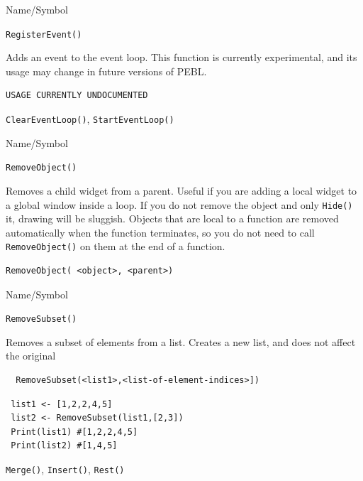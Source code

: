 \begin{desc}{Name/Symbol}
\item[Name/Symbol]  	\verb+RegisterEvent()+ 

\item[Description]  Adds an event to the event loop.  This function is currently experimental, and its usage may change in future versions of PEBL.

\item[Usage]       	
\begin{verbatim}
USAGE CURRENTLY UNDOCUMENTED
\end{verbatim}

\item[Example]	

\item[See Also] 
\verb+ClearEventLoop()+, \verb+StartEventLoop()+
\end{desc}






\begin{desc}{Name/Symbol}
\item[Name/Symbol]	\verb+RemoveObject()+

\item[Description] Removes a child widget from a parent.  Useful if
  you are adding a local widget to a global window inside a loop.  If
  you do not remove the object and only \verb+Hide()+ it, drawing will
  be sluggish.  Objects that are local to a function are removed
  automatically when the function terminates, so you do not need to
  call \verb+RemoveObject()+ on them at the end of a function.

\item[Usage]
\begin{verbatim}
RemoveObject( <object>, <parent>)
\end{verbatim}

\item[Example]	

\item[See Also]	
\end{desc}


\begin{desc}{Name/Symbol}
\item[Name/Symbol]	\verb+RemoveSubset()+

\item[Description] Removes a subset of elements from a list. Creates
a new list, and does not affect the original

\item[Usage]
\begin{verbatim}
  RemoveSubset(<list1>,<list-of-element-indices>])
\end{verbatim}

\item[Example]	
\begin{verbatim}
 list1 <- [1,2,2,4,5]
 list2 <- RemoveSubset(list1,[2,3])
 Print(list1) #[1,2,2,4,5]
 Print(list2) #[1,4,5]
\end{verbatim}

\item[See Also]	
\verb+Merge()+, \verb+Insert()+, \verb+Rest()+
\end{desc}


